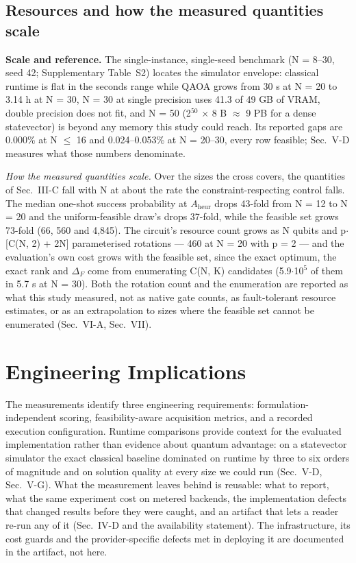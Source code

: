 \documentclass{ieeeaccess}
\begin{document}
\subsection{Resources and how the measured quantities scale}


\textbf{Scale and reference.} The single-instance, single-seed benchmark (N = 8--30, seed 42; Supplementary Table~S2) locates the simulator envelope: classical runtime is flat in the seconds range while QAOA grows from 30 s at N = 20 to 3.14 h at N = 30, N = 30 at single precision uses 41.3 of 49 GB of VRAM, double precision does not fit, and N = 50 (2$^{50}$ $\times$ 8 B $\approx$ 9 PB for a dense statevector) is beyond any memory this study could reach. Its reported gaps are 0.000\% at N $\leq$ 16 and 0.024--0.053\% at N = 20--30, every row feasible; Sec.~V-D measures what those numbers denominate.


\textit{How the measured quantities scale.} Over the sizes the cross covers, the quantities of Sec.~III-C fall with N at about the rate the constraint-respecting control falls. The median one-shot success probability at $A_{\mathrm{heur}}$ drops 43-fold from N = 12 to N = 20 and the uniform-feasible draw's drops 37-fold, while the feasible set grows 73-fold (66, 560 and 4,845). The circuit's resource count grows as N qubits and p$\cdot$[C(N, 2) + 2N] parameterised rotations --- 460 at N = 20 with p = 2 --- and the evaluation's own cost grows with the feasible set, since the exact optimum, the exact rank and $\Delta_{F}$ come from enumerating C(N, K) candidates (5.9$\cdot$10$^{5}$ of them in 5.7 s at N = 30). Both the rotation count and the enumeration are reported as what this study measured, not as native gate counts, as fault-tolerant resource estimates, or as an extrapolation to sizes where the feasible set cannot be enumerated (Sec.~VI-A, Sec.~VII).


\section{Engineering Implications}


The measurements identify three engineering requirements: formulation-independent scoring, feasibility-aware acquisition metrics, and a recorded execution configuration. Runtime comparisons provide context for the evaluated implementation rather than evidence about quantum advantage: on a statevector simulator the exact classical baseline dominated on runtime by three to six orders of magnitude and on solution quality at every size we could run (Sec.~V-D, Sec.~V-G). What the measurement leaves behind is reusable: what to report, what the same experiment cost on metered backends, the implementation defects that changed results before they were caught, and an artifact that lets a reader re-run any of it (Sec.~IV-D and the availability statement). The infrastructure, its cost guards and the provider-specific defects met in deploying it are documented in the artifact, not here.
\end{document}
